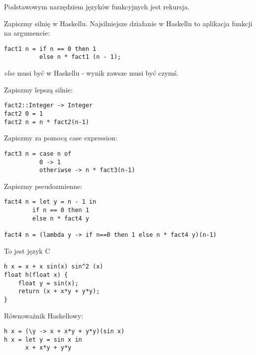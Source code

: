 \documentclass{article}
\newenvironment{information}[1]{%
    \trivlist
    \item[\hskip\labelsep\textbf{Information. #1.}]
    \ignorespaces
}{%
    \endtrivlist
}
\begin{document}
\noindent
Podstawowym narzędziem języków funkcyjnych jest rekursja.

\begin{information}{Silnia}
Zapiszmy silnię w Haskellu. Najsilniejsze działanie w Haskellu to aplikacja funkcji na argumencie:
\begin{verbatim}
fact1 n = if n == 0 then 1 
          else n * fact1 (n - 1);
\end{verbatim}
\textit{else} musi być w Haskellu - wynik zawsze musi być czymś.
\end{information}


\begin{information}{Pattern Matchings}
Zapiszmy lepszą silnie:
\begin{verbatim}
fact2::Integer -> Integer
fact2 0 = 1
fact2 n = n * fact2(n-1)
\end{verbatim}
\end{information}

\begin{information}{Case Expression}
Zapiszmy za pomocą case expression:
\begin{verbatim}
fact3 n = case n of
          0 -> 1
          otheriwse -> n * fact3(n-1) 
\end{verbatim}
\end{information}

\begin{information}{Pseudozmienne}
Zapiszmy pseudozmienne:
\begin{verbatim}
fact4 n = let y = n - 1 in
        if n == 0 then 1
        else n * fact4 y

fact4 n = (lambda y -> if n==0 then 1 else n * fact4 y)(n-1)
\end{verbatim}
\end{information}
To jest język C
\begin{verbatim}
h x = x + x sin(x) sin^2 (x)
float h(float x) {
    float y = sin(x);
    return (x + x*y + y*y);
}
\end{verbatim}
Równoważnik Haskellowy:
\begin{verbatim}
h x = (\y -> x + x*y + y*y)(sin x)
h x = let y = sin x in 
      x + x*y + y*y
\end{verbatim}
\end{document}
